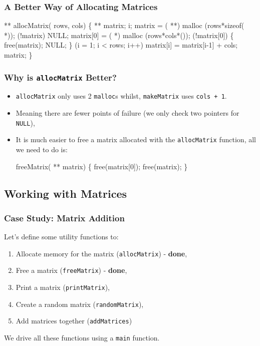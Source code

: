\documentclass[smaller,table]{beamer}
\begin{document}
\begin{frame}[fragile]
\frametitle{A Better Way of Allocating Matrices}
\begin{semiverbatim}
\scriptsize
\kr\kl{} ** allocMatrix( rows,  cols)
\kl\{
\kl   {} ** matrix;
\kl   {} i;
\kl
\kl   matrix = ( **) malloc (rows*sizeof( *));
\kl   {} (!matrix)  NULL; 
\kl
\kl   matrix[0] = ( *) malloc (rows*cols*());
\kl   {} (!matrix[0])
\kl   \{
\kl      free(matrix); 
\kl      {} NULL;  
\kl   \}
\kl
\kl   {} (i = 1; i < rows; i++)
\kl      matrix[i] = matrix[i-1] + cols;
\kl
\kl   {} matrix;
\kl\}
\end{semiverbatim}
\end{frame}

\begin{frame}[fragile]
\frametitle{Why is {\tt allocMatrix} Better?}
\begin{itemize}
\item {\tt allocMatrix} only uses 2 {\tt malloc}s whilst, {\tt makeMatrix} uses {\tt cols + 1}.
\item Meaning there are fewer points of failure (we only check two pointers for {\tt NULL}),
\item It is much easier to free a matrix allocated with the {\tt allocMatrix} function, all we need to do is:
\begin{semiverbatim}
 freeMatrix( ** matrix)
\{
   free(matrix[0]);
   free(matrix);
\}
\end{semiverbatim}
\end{itemize}
\end{frame}

\subsection{Working with Matrices}
\begin{frame}
\frametitle{Case Study: Matrix Addition}
Let's define some utility functions to:
\begin{enumerate}
\item Allocate memory for the matrix ({\tt allocMatrix}) - {\bf done},
\item Free a matrix ({\tt freeMatrix}) - {\bf done},
\item Print a matrix ({\tt printMatrix}),
\item Create a random matrix ({\tt randomMatrix}),
\item Add matrices together ({\tt addMatrices})
\end{enumerate}
We drive all these functions using a {\tt main} function.
\end{frame}
\end{document}
